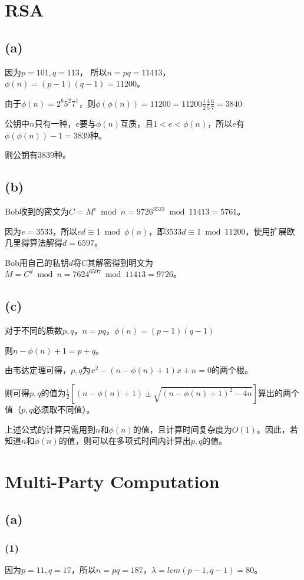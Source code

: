 \documentclass[twoside,11pt]{article}
\begin{document}
\section{RSA}
\subsection*{(a)}
因为$p=101,q=113$，
所以$n=pq=11413$，$\phi(n)=(p-1)(q-1)=11200$。

由于$\phi(n)=2^6 5^2 7^1$，则$\phi(\phi(n))=11200=11200 \frac{1}{2} \frac{4}{5} \frac{6}{7} = 3840$

公钥中$n$只有一种，$e$要与$\phi(n)$互质，且$1<e<\phi(n)$，所以$e$有$\phi(\phi(n))-1=3839$种。

则公钥有$3839$种。

\subsection*{(b)}
Bob收到的密文为$C = M^e \bmod{n} = 9726^{3533} \bmod{11413} = 5761$。

因为$e=3533$，所以$ed \equiv 1 \bmod{\phi(n)}$，即$3533d \equiv 1 \bmod{11200}$，使用扩展欧几里得算法解得$d=6597$。

Bob用自己的私钥$d$将$C$其解密得到明文为$M = C^d \bmod{n} = 7624^{6597} \bmod{11413} = 9726$。

\subsection*{(c)}
对于不同的质数$p,q$，$n=pq$，$\phi(n)=(p-1)(q-1)$

则$n-\phi(n)+1=p+q$。

由韦达定理可得，$p,q$为$x^2 - (n-\phi(n)+1)x + n =0$的两个根。

则可得$p, q$的值为$\frac{1}{2} [(n-\phi(n)+1) \pm \sqrt{(n-\phi(n)+1)^2 - 4n}]$算出的两个值（$p,q$必须取不同值）。

上述公式的计算只需用到$n$和$\phi(n)$的值，且计算时间复杂度为$O(1)$。因此，若知道$n$和$\phi(n)$的值，则可以在多项式时间内计算出$p,q$的值。

\section{Multi-Party Computation}
\subsection*{(a)}
\subsubsection*{(1)}
因为$p=11, q=17$，所以$n=pq=187$，$\lambda=lcm(p-1, q-1)=80$。
\end{document}
